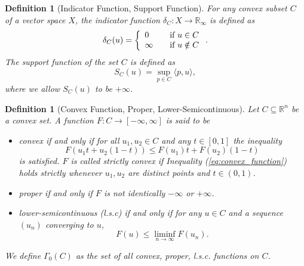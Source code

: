\documentclass[abstracton]{scrreprt}
\newtheorem{definition}[theorem]{Definition}
\begin{document}
        \begin{definition}[Indicator Function, Support Function] %
        \label{def:indicator_function}
            For any convex subset $C$ of a vector space $X$, the indicator function $\delta_{C}: X \longrightarrow \mathbb{R}_{\infty}$ is defined as
                $$
                    \delta_{C}(u) =
                    \left\{
                        \begin{array}{l l}
                          0      & \quad \text{if $u \in C$} \\
                          \infty & \quad \text{if $u \notin C$}
                        \end{array}
                    \right. .
                $$
            The support function of the set $C$ is defined as
                $$
                    S_{C}(u) = \sup_{p \in C} \langle p, u \rangle,
                $$
            where we allow $S_{C}(u)$ to be $+\infty$.
    
        \end{definition}
        \begin{definition}[Convex Function, Proper, Lower-Semicontinuous] %
        \label{def:convex_function_proper_lower_semicontinuous}
            Let $C \subseteq \mathbb{R}^{n}$ be a convex set. A function $F: C \longrightarrow [-\infty, \infty]$ is said to be
                \begin{itemize}
                    \item convex if and only if for all $u_{1}, u_{2} \in C$ and any $t \in [0, 1]$ the inequality
                    \begin{equation}
                        F(u_{1}t + u_{2}(1 - t)) \le F(u_{1})t + F(u_{2})(1 - t)
                        \label{eq:convex_function}
                    \end{equation}
                    is satisfied. $F$ is called strictly convex if Inequality (\ref{eq:convex_function}) holds strictly whenever $u_{1}, u_{2}$ are distinct points and $t \in (0, 1)$.
                    \item proper if and only if $F$ is not identically $-\infty$ or $+\infty$.
                    \item lower-semicontinuous (l.s.c) if and only if for any $u \in C$ and a sequence $(u_{n})$ converging to $u$,
                        $$
                            F(u) \le \liminf_{n \rightarrow \infty} F(u_{n}).
                        $$
                \end{itemize}
            We define $\Gamma_{0}(C)$ as the set of all convex, proper, l.s.c. functions on $C$.
        \end{definition}
\end{document}
